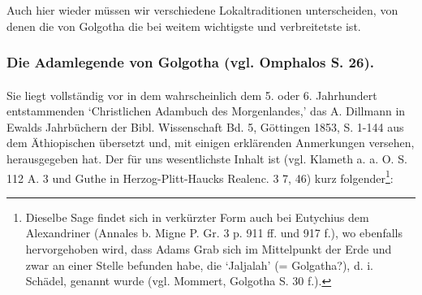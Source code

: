 \documentclass[a4paper, 11pt, oneside]{article}
\begin{document}
Auch hier wieder müssen wir verschiedene Lokaltraditionen unterscheiden, von denen die von Golgotha die bei weitem wichtigste und verbreitetste ist.

\subsubsection{Die Adamlegende von Golgotha (vgl. Omphalos S. 26).}
\paragraph{}
Sie liegt vollständig vor in dem wahrscheinlich dem 5. oder 6. Jahrhundert entstammenden `Christlichen Adambuch des Morgenlandes,' das A. Dillmann in Ewalds Jahrbüchern der Bibl. Wissenschaft Bd. 5, Göttingen 1853, S. 1-144 aus dem Äthiopischen übersetzt und, mit einigen erklärenden Anmerkungen versehen, herausgegeben hat. Der für uns wesentlichste Inhalt ist (vgl. Klameth a. a. O. S. 112 A. 3 und Guthe in Herzog-Plitt-Haucks Realenc. 3 7, 46) kurz folgender\footnote{Dieselbe Sage findet sich in verkürzter Form auch bei Eutychius dem Alexandriner (Annales b. Migne P. Gr. 3 p. 911 ff. und 917 f.), wo ebenfalls hervorgehoben wird, dass Adams Grab sich im Mittelpunkt der Erde und zwar an einer Stelle befunden habe, die `Jaljalah' (= Golgatha?), d. i. Schädel, genannt wurde (vgl. Mommert, Golgotha S. 30 f.).}:
\end{document}
